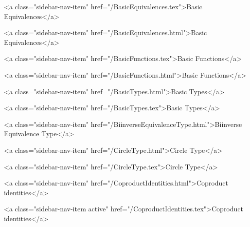       
    
      
        
          <a class="sidebar-nav-item" href="/BasicEquivalences.tex">Basic Equivalences</a>
        
      
    
      
        
          <a class="sidebar-nav-item" href="/BasicEquivalences.html">Basic Equivalences</a>
        
      
    
      
        
          <a class="sidebar-nav-item" href="/BasicFunctions.tex">Basic Functions</a>
        
      
    
      
        
          <a class="sidebar-nav-item" href="/BasicFunctions.html">Basic Functions</a>
        
      
    
      
        
          <a class="sidebar-nav-item" href="/BasicTypes.html">Basic Types</a>
        
      
    
      
        
          <a class="sidebar-nav-item" href="/BasicTypes.tex">Basic Types</a>
        
      
    
      
        
          <a class="sidebar-nav-item" href="/BiinverseEquivalenceType.html">Biinverse Equivalence Type</a>
        
      
    
      
        
          <a class="sidebar-nav-item" href="/CircleType.html">Circle Type</a>
        
      
    
      
        
          <a class="sidebar-nav-item" href="/CircleType.tex">Circle Type</a>
        
      
    
      
        
          <a class="sidebar-nav-item" href="/CoproductIdentities.html">Coproduct identities</a>
        
      
    
      
        
          <a class="sidebar-nav-item active" href="/CoproductIdentities.tex">Coproduct identities</a>
        
